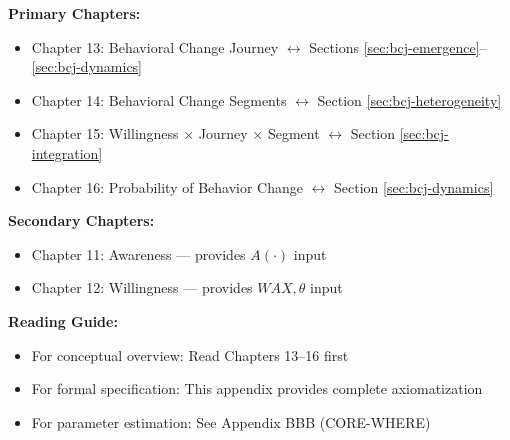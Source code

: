 \begin{tcolorbox}[colback=purple!5!white, colframe=purple!75!black,
    title=Chapter Linkage]

\textbf{Primary Chapters:}
\begin{itemize}[nosep]
\item Chapter 13: Behavioral Change Journey $\leftrightarrow$ Sections \ref{sec:bcj-emergence}--\ref{sec:bcj-dynamics}
\item Chapter 14: Behavioral Change Segments $\leftrightarrow$ Section \ref{sec:bcj-heterogeneity}
\item Chapter 15: Willingness × Journey × Segment $\leftrightarrow$ Section \ref{sec:bcj-integration}
\item Chapter 16: Probability of Behavior Change $\leftrightarrow$ Section \ref{sec:bcj-dynamics}
\end{itemize}

\textbf{Secondary Chapters:}
\begin{itemize}[nosep]
\item Chapter 11: Awareness --- provides $A(\cdot)$ input
\item Chapter 12: Willingness --- provides $WAX, \theta$ input
\end{itemize}

\textbf{Reading Guide:}
\begin{itemize}[nosep]
\item For conceptual overview: Read Chapters 13--16 first
\item For formal specification: This appendix provides complete axiomatization
\item For parameter estimation: See Appendix BBB (CORE-WHERE)
\end{itemize}

\end{tcolorbox}

